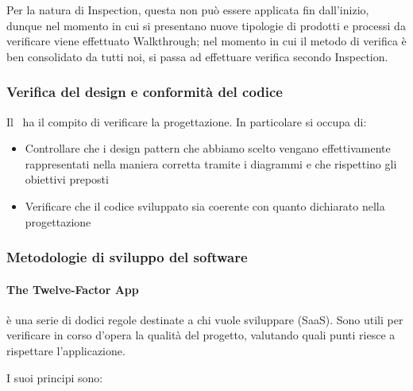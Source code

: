 			Per la natura di Inspection, questa non può essere applicata fin dall'inizio, dunque nel momento in cui si presentano nuove tipologie di
			prodotti e processi da verificare viene effettuato Walkthrough; nel momento in cui il metodo di verifica è ben consolidato da tutti noi,
			si passa ad effettuare verifica secondo Inspection.

		\subsubsection{Verifica del design e conformità del codice}	\label{VerificaDesign}
		Il \Ver\ ha il compito di verificare la progettazione.
		In particolare si occupa di:
		\begin{itemize}
			\item Controllare che i design pattern che abbiamo scelto vengano effettivamente rappresentati nella maniera corretta tramite i diagrammi e che rispettino gli obiettivi preposti
			\item Verificare che il codice sviluppato sia coerente con quanto dichiarato nella progettazione
		\end{itemize}


		\subsubsection{Metodologie di sviluppo del software}

		\paragraph{The Twelve-Factor App}
		 è una serie di dodici regole destinate a chi vuole sviluppare  (SaaS). Sono utili per verificare in corso d'opera la qualità del progetto, valutando quali punti riesce a rispettare l'applicazione.

		I suoi principi sono:

